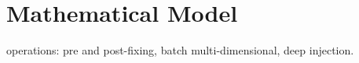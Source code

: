 \section{Mathematical Model}
\label{math}

operations: pre and post-fixing, batch multi-dimensional, deep injection.